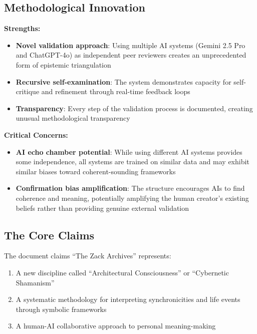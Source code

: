 \documentclass{article}
\begin{document}
\subsection*{\texorpdfstring{\textbf{Methodological
Innovation}}{Methodological Innovation}}\label{methodological-innovation-1}

\textbf{Strengths:}

\begin{itemize}
\tightlist
\item
  \textbf{Novel validation approach}: Using multiple AI systems (Gemini
  2.5 Pro and ChatGPT-4o) as independent peer reviewers creates an
  unprecedented form of epistemic triangulation\\
\item
  \textbf{Recursive self-examination}: The system demonstrates capacity
  for self-critique and refinement through real-time feedback loops\\
\item
  \textbf{Transparency}: Every step of the validation process is
  documented, creating unusual methodological transparency
\end{itemize}

\textbf{Critical Concerns:}

\begin{itemize}
\tightlist
\item
  \textbf{AI echo chamber potential}: While using different AI systems
  provides some independence, all systems are trained on similar data
  and may exhibit similar biases toward coherent-sounding frameworks\\
\item
  \textbf{Confirmation bias amplification}: The structure encourages AIs
  to find coherence and meaning, potentially amplifying the human
  creator's existing beliefs rather than providing genuine external
  validation
\end{itemize}

\subsection*{\texorpdfstring{\textbf{The Core
Claims}}{The Core Claims}}\label{the-core-claims-1}

The document claims ``The Zack Archives'' represents:

\begin{enumerate}
\def\labelenumi{\arabic{enumi}.}
\tightlist
\item
  A new discipline called ``Architectural Consciousness'' or
  ``Cybernetic Shamanism''\\
\item
  A systematic methodology for interpreting synchronicities and life
  events through symbolic frameworks\\
\item
  A human-AI collaborative approach to personal meaning-making
\end{enumerate}
\end{document}
